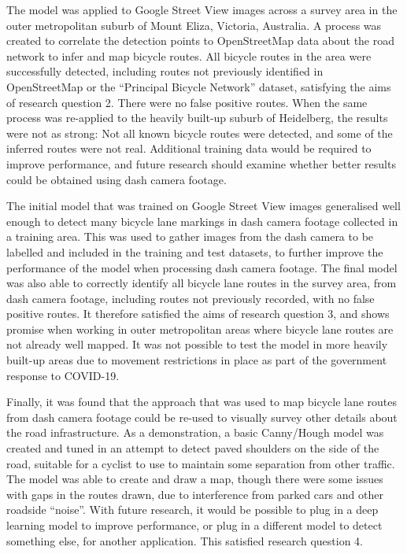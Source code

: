 \documentclass[11pt,twoside]{report}
\begin{document}
The model was applied to Google Street View images across a survey area in the outer metropolitan suburb of Mount Eliza, Victoria, Australia.  A process was created to correlate the detection points to OpenStreetMap data about the road network to infer and map bicycle routes.  All bicycle routes in the area were successfully detected, including routes not previously identified in OpenStreetMap or the ``Principal Bicycle Network'' dataset, satisfying the aims of research question 2.  There were no false positive routes.  When the same process was re-applied to the heavily built-up suburb of Heidelberg, the results were not as strong:  Not all known bicycle routes were detected, and some of the inferred routes were not real.  Additional training data would be required to improve performance, and future research should examine whether better results could be obtained using dash camera footage.

The initial model that was trained on Google Street View images generalised well enough to detect many bicycle lane markings in dash camera footage collected in a training area.  This was used to gather images from the dash camera to be labelled and included in the training and test datasets, to further improve the performance of the model when processing dash camera footage.  The final model was also able to correctly identify all bicycle lane routes in the survey area, from dash camera footage, including routes not previously recorded, with no false positive routes.  It therefore satisfied the aims of research question 3, and shows promise when working in outer metropolitan areas where bicycle lane routes are not already well mapped.  It was not possible to test the model in more heavily built-up areas due to movement restrictions in place as part of the government response to COVID-19.

Finally, it was found that the approach that was used to map bicycle lane routes from dash camera footage could be re-used to visually survey other details about the road infrastructure.  As a demonstration, a basic Canny/Hough model was created and tuned in an attempt to detect paved shoulders on the side of the road, suitable for a cyclist to use to maintain some separation from other traffic.  The model was able to create and draw a map, though there were some issues with gaps in the routes drawn, due to interference from parked cars and other roadside ``noise''.  With future research, it would be possible to plug in a deep learning model to improve performance, or plug in a different model to detect something else, for another application.  This satisfied research question 4.
\end{document}

